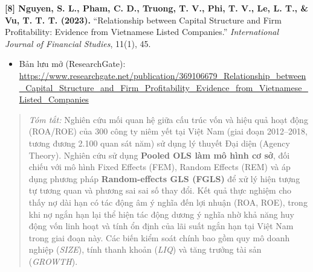 \documentclass[12pt,a4paper]{article}
\begin{document}
\noindent\textbf{[8] Nguyen, S. L., Pham, C. D., Truong, T. V., Phi, T. V., Le, L. T., \& Vu, T. T. T. (2023).} ``Relationship between Capital Structure and Firm Profitability: Evidence from Vietnamese Listed Companies.'' \textit{International Journal of Financial Studies}, 11(1), 45.
\begin{itemize}
    \item Bản lưu mở (ResearchGate): \url{https://www.researchgate.net/publication/369106679_Relationship_between_Capital_Structure_and_Firm_Profitability_Evidence_from_Vietnamese_Listed_Companies}
\end{itemize}
\begin{quote}
\textit{Tóm tắt:} Nghiên cứu mối quan hệ giữa cấu trúc vốn và hiệu quả hoạt động (ROA/ROE) của 300 công ty niêm yết tại Việt Nam (giai đoạn 2012--2018, tương đương 2.100 quan sát năm) sử dụng lý thuyết Đại diện (Agency Theory). Nghiên cứu sử dụng \textbf{Pooled OLS làm mô hình cơ sở}, đối chiếu với mô hình Fixed Effects (FEM), Random Effects (REM) và áp dụng phương pháp \textbf{Random-effects GLS (FGLS)} để xử lý hiện tượng tự tương quan và phương sai sai số thay đổi. Kết quả thực nghiệm cho thấy nợ dài hạn có tác động âm ý nghĩa đến lợi nhuận (ROA, ROE), trong khi nợ ngắn hạn lại thể hiện tác động dương ý nghĩa nhờ khả năng huy động vốn linh hoạt và tính ổn định của lãi suất ngắn hạn tại Việt Nam trong giai đoạn này. Các biến kiểm soát chính bao gồm quy mô doanh nghiệp (\textit{SIZE}), tính thanh khoản (\textit{LIQ}) và tăng trưởng tài sản (\textit{GROWTH}).
\end{quote}
\end{document}
